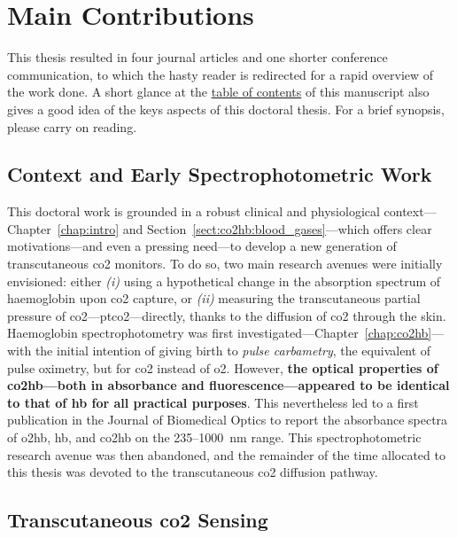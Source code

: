 \section{Main Contributions}

This thesis resulted in four journal articles and one shorter conference communication\cite{dervieux2020, dervieux2022, dervieux2023rate, dervieux2024phase, dervieux2024newcas}, to which the hasty reader is redirected for a rapid overview of the work done. A short glance at the \hyperref[chapter:toc]{table of contents} of this manuscript also gives a good idea of the keys aspects of this doctoral thesis. For a brief synopsis, please carry on reading.

\subsection{Context and Early Spectrophotometric Work}

This doctoral work is grounded in a robust clinical and physiological context---Chapter~\ref{chap:intro} and Section~\ref{sect:co2hb:blood_gases}---which offers clear motivations---and even a pressing need---to develop a new generation of transcutaneous \gls{co2} monitors. To do so, two main research avenues were initially envisioned: either \textit{(i)} using a hypothetical change in the absorption spectrum of haemoglobin upon \gls{co2} capture, or \textit{(ii)} measuring the transcutaneous partial pressure of \gls{co2}---\gls{ptco2}---directly, thanks to the diffusion of \gls{co2} through the skin. Haemoglobin spectrophotometry was first investigated---Chapter~\ref{chap:co2hb}---with the initial intention of giving birth to \emph{pulse carbametry}, \ie{} the equivalent of pulse oximetry, but for \gls{co2} instead of \gls{o2}. However, \textbf{the optical properties of \gls{co2hb}---both in absorbance and fluorescence---appeared to be identical to that of \gls{hb} for all practical purposes}. This nevertheless led to a first publication in the Journal of Biomedical Optics to report the absorbance spectra of \gls{o2hb}, \gls{hb}, and \gls{co2hb} on the 235--1000~nm range\cite{dervieux2020}. This spectrophotometric research avenue was then abandoned, and the remainder of the time allocated to this thesis was devoted to the transcutaneous \gls{co2} diffusion pathway.

\subsection{Transcutaneous \texorpdfstring{\gls{co2}}{CO2} Sensing}

